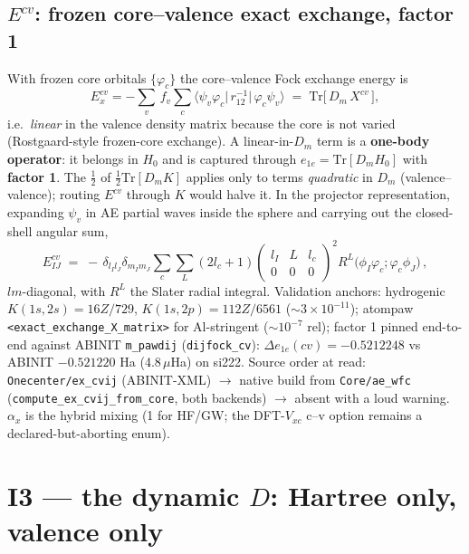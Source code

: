 \documentclass[11pt]{article}
\newcommand{\code}[1]{\texttt{#1}}
\begin{document}
\subsection{$E^{cv}$: frozen core--valence exact exchange, factor 1}
\label{sec:excv}
With frozen core orbitals $\{\varphi_c\}$ the core--valence Fock exchange
energy is
\begin{equation}
E_x^{cv} = -\sum_{v}\,f_v \sum_{c}
\big\langle \psi_v \varphi_c \big|\, r_{12}^{-1} \big|\,
\varphi_c \psi_v \big\rangle
\;=\; \mathrm{Tr}\big[\,D_m\, X^{cv}\,\big],
\end{equation}
i.e.\ \emph{linear} in the valence density matrix because the core is not
varied (Rostgaard-style frozen-core exchange). A linear-in-$D_m$ term is a
\textbf{one-body operator}: it belongs in $H_0$ and is captured through
$e_{1e}=\mathrm{Tr}[D_m H_0]$ with \textbf{factor 1}. The $\tfrac12$ of
$\tfrac12\mathrm{Tr}[D_m K]$ applies only to terms \emph{quadratic} in
$D_m$ (valence--valence); routing $E^{cv}$ through $K$ would halve it.
In the projector representation, expanding $\psi_v$ in AE partial waves
inside the sphere and carrying out the closed-shell angular sum,
\begin{equation}
E^{cv}_{IJ} \;=\; -\,\delta_{l_I l_J}\delta_{m_I m_J}
\sum_c \sum_L (2l_c+1)
\begin{pmatrix} l_I & L & l_c \\ 0&0&0 \end{pmatrix}^{\!2}
R^L\!\big(\phi_I\varphi_c;\varphi_c\phi_J\big)\,,
\label{eq:excv}
\end{equation}
$lm$-diagonal, with $R^L$ the Slater radial integral. Validation anchors:
hydrogenic $K(1s,2s)=16Z/729$, $K(1s,2p)=112Z/6561$ ($\sim 3\times
10^{-11}$); atompaw \code{<exact\_exchange\_X\_matrix>} for Al-stringent
($\sim 10^{-7}$ rel); factor 1 pinned end-to-end against ABINIT
\code{m\_pawdij} (\code{dijfock\_cv}): $\Delta e_{1e}(cv) = -0.5212248$ vs
ABINIT $-0.521220$ Ha (4.8\,$\mu$Ha) on si222. Source order at read:
\code{Onecenter/ex\_cvij} (ABINIT-XML) $\to$ native build from
\code{Core/ae\_wfc} (\code{compute\_ex\_cvij\_from\_core}, both backends)
$\to$ absent with a loud warning. $\alpha_x$ is the hybrid mixing (1 for
HF/GW; the DFT-$V_{xc}$ c--v option remains a declared-but-aborting enum).

\section{I3 --- the dynamic $D$: Hartree only, valence only}
\label{sec:dynamic}
\end{document}
